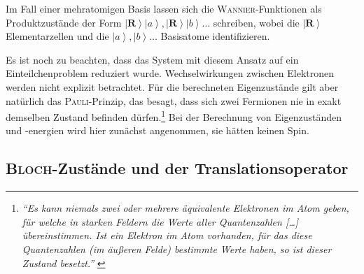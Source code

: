 \documentclass[a4paper, 10pt, twoside, openany]{book} %
\newcommand \ket[1]{\left | #1 \right \rangle}
\def \vec {\boldsymbol}
\begin{document}
	Im Fall einer mehratomigen Basis lassen sich die \textsc{Wannier}-Funktionen als Produktzustände der Form $\ket{\vec R} \ket{a}, \ket{\vec R} \ket{b}\dots$ schreiben, wobei die $\ket{\vec R}$ Elementarzellen und die $\ket a, \ket b\dots$ Basisatome identifizieren.
	
	Es ist noch zu beachten, dass das System mit diesem Ansatz auf ein Einteilchenproblem reduziert wurde. Wechselwirkungen zwischen Elektronen werden nicht explizit betrachtet. Für die berechneten Eigenzustände gilt aber natürlich das \textsc{Pauli}-Prinzip, das besagt, dass sich zwei Fermionen nie in exakt demselben Zustand befinden dürfen.\footnote{\emph{"`Es kann niemals zwei oder mehrere äquivalente Elektronen im Atom geben, für welche in starken Feldern die Werte aller Quantenzahlen \emph{[\dots]} übereinstimmen. Ist ein Elektron im Atom vorhanden, für das diese Quantenzahlen (im äußeren Felde) bestimmte Werte haben, so ist dieser Zustand \glq besetzt\grq."'} \cite[S.~776]{Pauli}} Bei der Berechnung von Eigenzuständen und -energien wird hier zunächst angenommen, sie hätten keinen Spin. 
	
	\subsection{\textsc{Bloch}-Zustände und der Translationsoperator}
	
\end{document}
